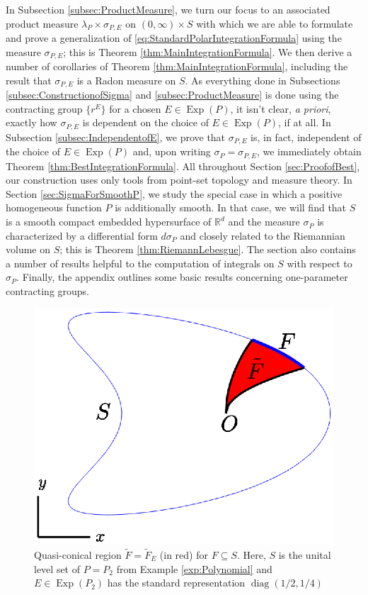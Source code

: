 \documentclass[smallextended]{svjour3}
\theoremstyle{remark}
\newcommand\Exp{\operatorname{Exp}}
\newcommand\diag{\operatorname{diag}}
\begin{document}
\noindent In Subsection \ref{subsec:ProductMeasure}, we turn our focus to an associated product measure $\lambda_P\times\sigma_{P,E}$ on $(0,\infty)\times S$ with which we are able to formulate and prove a generalization of \eqref{eq:StandardPolarIntegrationFormula} using the measure $\sigma_{P,E}$; this is Theorem \ref{thm:MainIntegrationFormula}. We then derive a number of corollaries of Theorem \ref{thm:MainIntegrationFormula}, including the result that $\sigma_{P,E}$ is a Radon measure on $S$. As everything done in Subsections \ref{subsec:ConstructionofSigma} and \ref{subsec:ProductMeasure} is done using the contracting group $\{r^E\}$ for a chosen $E\in\Exp(P)$, it isn't clear, \textit{a priori}, exactly how $\sigma_{P,E}$ is dependent on the choice of $E\in\Exp(P)$, if at all. In Subsection \ref{subsec:IndependentofE}, we prove that $\sigma_{P,E}$ is, in fact, independent of the choice of $E\in \Exp(P)$ and, upon writing $\sigma_P=\sigma_{P,E}$, we immediately obtain Theorem \ref{thm:BestIntegrationFormula}. All throughout Section \ref{sec:ProofofBest}, our construction uses only tools from point-set topology and measure theory.  In Section \ref{sec:SigmaForSmoothP}, we study the special case in which a positive homogeneous function $P$ is additionally smooth. In that case, we will find that $S$ is a smooth compact embedded hypersurface of $\mathbb{R}^d$ and the measure $\sigma_P$ is characterized by a differential form $d\sigma_P$ and closely related to the Riemannian volume on $S$; this is Theorem \ref{thm:RiemannLebesgue}. The section also contains a number of results helpful to the computation of integrals on $S$ with respect to $\sigma_P$. Finally, the appendix outlines some basic results concerning one-parameter contracting groups.  


\begin{figure}[!htb]
    \centering
    \includegraphics[scale=0.5, trim={1cm 1cm 1cm 0.5cm},clip]{Fig3.eps}
    \caption{Quasi-conical region $\widetilde{F}=\widetilde{F}_E$ (in red) for $F\subseteq S$. Here, $S$ is the unital level set of $P=P_2$ from Example \ref{exp:Polynomial} and $E\in\Exp(P_2)$ has the standard representation $\diag(1/2,1/4)$}
    \label{fig:level_set_F}
\end{figure}
\end{document}
